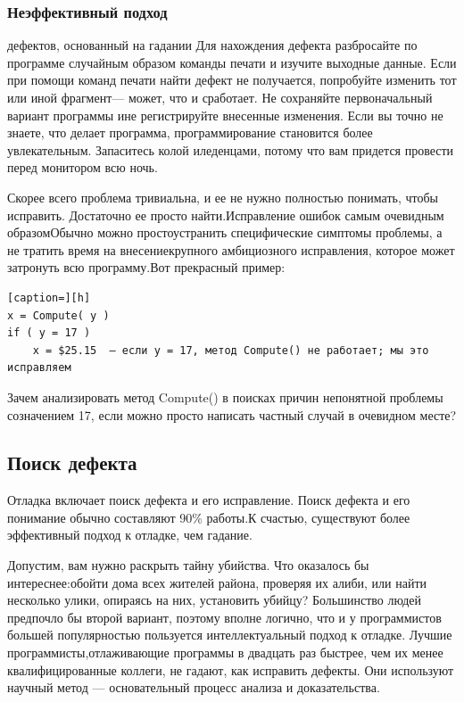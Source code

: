 \documentclass[a4paper]{article}
\begin{document}
\subsubsection{Неэффективный подход}

{  дефектов,  основанный  на  гадании} Для  нахождения дефекта разбросайте по программе случайным образом  команды  печати  и  изучите  выходные  данные.  Если  при  помощи  команд  печати  найти  дефект  не  получается,  попробуйте  изменить  тот  или  иной  фрагмент—  может,  что  и  сработает.  Не  сохраняйте  первоначальный  вариант  программы  ине регистрируйте внесенные изменения. Если вы точно не знаете, что делает программа,  программирование  становится  более  увлекательным.  Запаситесь  колой  иледенцами,  потому  что  вам  придется  провести  перед  монитором  всю  ночь.

 Скорее всего проблема  тривиальна,  и  ее  не  нужно  полностью  понимать,  чтобы  исправить.  Достаточно  ее  просто  найти.Исправление  ошибок  самым  очевидным  образомОбычно  можно  простоустранить  специфические  симптомы  проблемы,  а  не  тратить  время  на  внесениекрупного  амбициозного  исправления,  которое  может  затронуть  всю  программу.Вот  прекрасный  пример:
\begin{lstlisting}[caption=][h]
x = Compute( y )
if ( y = 17 )
    x = $25.15  — если y = 17, метод Compute() не работает; мы это исправляем
\end{lstlisting}

Зачем  анализировать  метод  Compute()  в  поисках  причин  непонятной  проблемы  созначением 17,  если  можно  просто  написать  частный  случай  в  очевидном  месте?

\subsection{Поиск дефекта}

Отладка  включает  поиск  дефекта  и  его  исправление.  Поиск  дефекта  и  его  понимание  обычно  составляют  90\%  работы.К счастью, существуют более эффективный подход к отладке, чем гадание.

Допустим,  вам  нужно  раскрыть  тайну  убийства.  Что  оказалось  бы  интереснее:обойти дома всех жителей района, проверяя их алиби, или найти несколько улики,  опираясь  на  них,  установить  убийцу?  Большинство  людей  предпочло  бы  второй  вариант,  поэтому  вполне  логично,  что  и  у  программистов  большей  популярностью  пользуется  интеллектуальный  подход  к  отладке.  Лучшие  программисты,отлаживающие  программы  в  двадцать  раз  быстрее,  чем  их  менее  квалифицированные коллеги, не гадают, как исправить дефекты. Они используют научный метод ---  основательный  процесс  анализа  и  доказательства.
\end{document}
